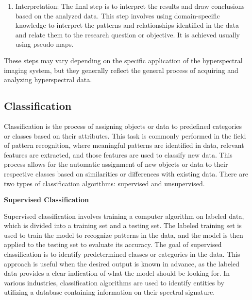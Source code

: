 \documentclass{article}
\begin{document}
{\begin{enumerate}
                 \item Interpretation: The final step is to interpret the results and draw conclusions based on the analyzed data. This step involves using domain-specific knowledge to  interpret the patterns and relationships identified in the data and relate them to the research question or objective. It is achieved usually using pseudo maps.
                 \end{enumerate}
                 These steps may vary depending on the specific application of the hyperspectral imaging system, but they generally reflect the general process of acquiring and analyzing hyperspectral data.
                 \newpage
                 
            \subsection{Classification}
                    \hspace{0.5cm}Classification is the process of assigning objects or data to predefined categories or classes based on their attributes. This task is commonly performed in the field of pattern recognition, where meaningful patterns are identified in data, relevant features are extracted, and those features are used to classify new data. This process allows for the automatic assignment of new objects or data to their respective classes based on similarities or differences with existing data. There are two types of classification algorithms: supervised and unsupervised.\par
                
                \textbf{Supervised Classification}
                
                    \hspace{0.5cm}Supervised classification involves training a computer algorithm on labeled data, which is divided into a training set and a testing set. The labeled training set is used to train the model to recognize patterns in the data, and the model is then applied to the testing set to evaluate its accuracy. The goal of supervised classification is to identify predetermined classes or categories in the data. This approach is useful when the desired output is known in advance, as the labeled data provides a clear indication of what the model should be looking for. In various industries, classification algorithms are used to identify entities by utilizing a database containing information on their spectral signature.\par
                
}
\end{document}
